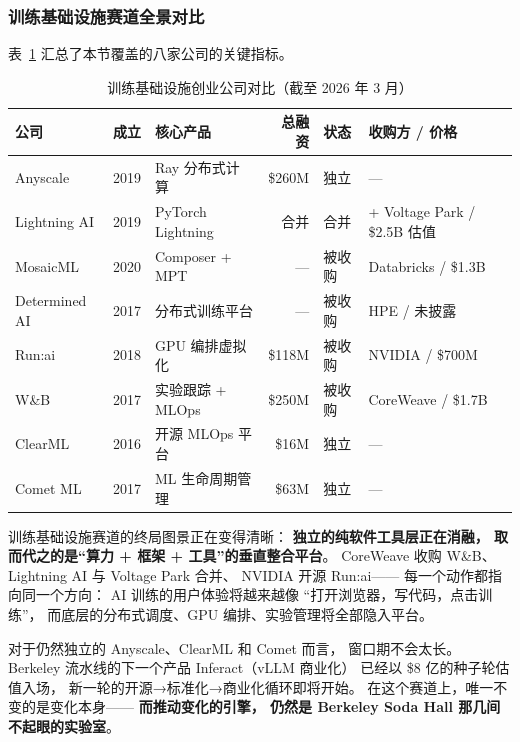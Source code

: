 \subsubsection{训练基础设施赛道全景对比}

表~\ref{tab:training-infra-comparison} 汇总了本节覆盖的八家公司的关键指标。

\begin{table}[htbp]
\centering
\caption{训练基础设施创业公司对比（截至 2026 年 3 月）}
\label{tab:training-infra-comparison}
\small
\begin{tabularx}{\textwidth}{@{}l l l r l l@{}}
\toprule
\rowcolor{figLightGray}
\textbf{公司} & \textbf{成立} & \textbf{核心产品} &
  \textbf{总融资} & \textbf{状态} & \textbf{收购方 / 价格} \\
\midrule
Anyscale        & 2019 & Ray 分布式计算        & \$260M  & 独立      & --- \\
Lightning AI    & 2019 & PyTorch Lightning     & 合并    & 合并      & + Voltage Park / \$2.5B 估值 \\
MosaicML        & 2020 & Composer + MPT        & ---     & 被收购    & Databricks / \$1.3B \\
Determined AI   & 2017 & 分布式训练平台         & ---     & 被收购    & HPE / 未披露 \\
Run:ai          & 2018 & GPU 编排虚拟化        & \$118M  & 被收购    & NVIDIA / \$700M \\
W\&B            & 2017 & 实验跟踪 + MLOps      & \$250M  & 被收购    & CoreWeave / \$1.7B \\
ClearML         & 2016 & 开源 MLOps 平台       & \$16M   & 独立      & --- \\
Comet ML        & 2017 & ML 生命周期管理       & \$63M   & 独立      & --- \\
\bottomrule
\end{tabularx}
\end{table}

训练基础设施赛道的终局图景正在变得清晰：
\textbf{独立的纯软件工具层正在消融，
取而代之的是``算力 + 框架 + 工具''的垂直整合平台}。
CoreWeave 收购 W\&B、Lightning AI 与 Voltage Park 合并、
NVIDIA 开源 Run:ai——
每一个动作都指向同一个方向：
AI 训练的用户体验将越来越像
``打开浏览器，写代码，点击训练''，
而底层的分布式调度、GPU 编排、实验管理将全部隐入平台。

对于仍然独立的 Anyscale、ClearML 和 Comet 而言，
窗口期不会太长。
Berkeley 流水线的下一个产品 Inferact（vLLM 商业化）
已经以 \$8 亿的种子轮估值入场，
新一轮的开源→标准化→商业化循环即将开始。
在这个赛道上，唯一不变的是变化本身——
\textbf{而推动变化的引擎，
仍然是 Berkeley Soda Hall 那几间不起眼的实验室}。

